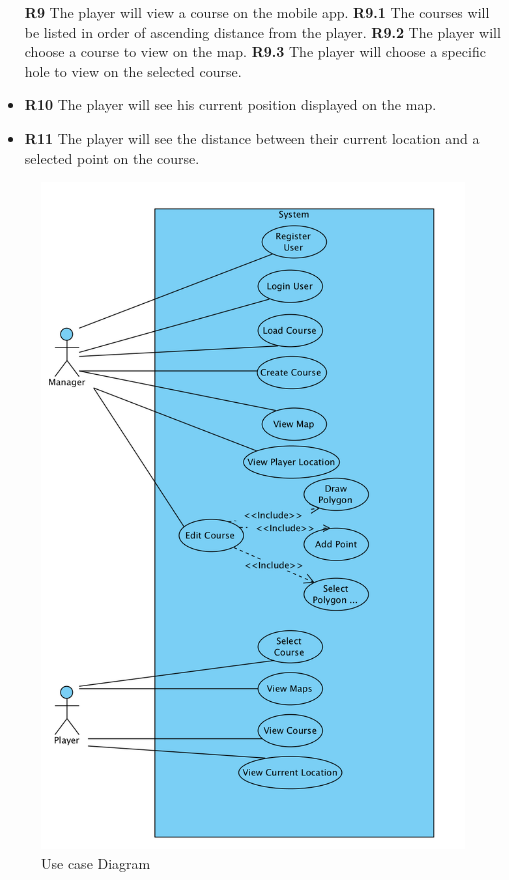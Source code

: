 \documentclass{article}
\begin{document}
\begin{itemize}
            \textbf{R9} The player will view a course on the mobile app.
            \subitem \textbf{R9.1} The courses will be listed in order of
            ascending distance from the player.
            \subitem \textbf{R9.2} The player will choose a course to view on
            the map.
            \subitem \textbf{R9.3} The player will choose a specific hole to
            view on the selected course.
        \item
            \textbf{R10} The player will see his current position displayed on
            the map.
        \item
            \textbf{R11} The player will see the distance between their current
            location and a selected point on the course.
    \end{itemize}
    

    \begin{figure}[h]
    \centering
    \includegraphics[scale=0.6]{UsecaseDiagram}
    \caption{Use case Diagram}
    \label{fig:usecase}
    \end{figure}
\end{document}
